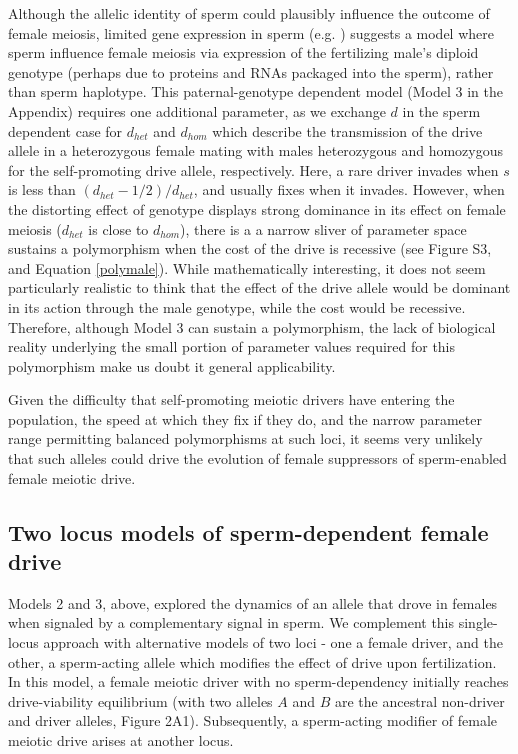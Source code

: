 \documentclass{pnastwo}
\begin{document}
\begin{article}
Although the allelic identity of sperm could plausibly influence the outcome of female meiosis, 
	limited gene expression in sperm (e.g. \cite{Joseph2004}) 
	suggests a model where sperm influence female meiosis via expression of the fertilizing male's
	diploid genotype (perhaps due to proteins and RNAs packaged into the sperm), rather than sperm haplotype.
This paternal-genotype dependent model (Model 3  in the Appendix) requires one additional parameter, as we exchange $d$ in the sperm dependent case for $d_{het}$ and $d_{hom}$ which describe the transmission of the drive allele in a heterozygous female mating with males heterozygous and homozygous for the self-promoting drive allele, respectively.  
Here, a rare driver invades when $s$ is less than $(d_{het}-1/2)/d_{het}$, and usually fixes when it invades.
However, when the distorting effect of genotype displays strong dominance in its
	effect on female meiosis ($d_{het}$ is close to $d_{hom}$), 
	there is a a narrow sliver of parameter space sustains a polymorphism
	when the cost of the drive is recessive
	(see Figure S3, and Equation \ref{polymale}).  
While mathematically interesting, it does not seem particularly realistic to think that the
	effect of the drive allele would be dominant in its action through the
	male genotype, while the cost would be recessive. 
Therefore, although Model 3 can sustain a polymorphism, 
	the lack of biological reality underlying the small portion of parameter values 
	required for this polymorphism make us doubt it general applicability. 


Given the difficulty that self-promoting meiotic drivers have entering the population, the speed at
which they fix if they do, and the narrow parameter range permitting balanced polymorphisms at such loci,  
it seems very unlikely that such alleles could drive the evolution of female suppressors of sperm-enabled
female meiotic drive.

\subsection{Two locus models of sperm-dependent female drive}
Models 2 and 3, above, explored the dynamics of an allele that drove in females when signaled by a complementary signal in sperm.   
We complement this single-locus approach %
	with alternative models of two loci - one a female driver, 
	and the other, a sperm-acting allele which modifies the effect of drive upon fertilization. 
In this model, a female meiotic driver with no sperm-dependency 
	initially reaches drive-viability equilibrium (with two alleles
	$A$ and $B$ are the ancestral non-driver and driver alleles, Figure 2A1). 
Subsequently, a sperm-acting modifier of female meiotic drive arises at another locus. 


\end{article}
\end{document}
